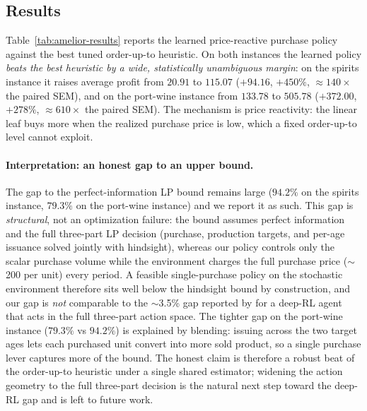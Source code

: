 \documentclass[11pt]{article}
\begin{document}
\subsection{Results}
\label{sec:amelior-results}

Table~\ref{tab:amelior-results} reports the learned price-reactive purchase policy against the best
tuned order-up-to heuristic. On both instances the learned policy \emph{beats the best heuristic by a
wide, statistically unambiguous margin}: on the spirits instance it raises average profit from
$20.91$ to $115.07$ ($+94.16$, $+450\%$, $\approx140\times$ the paired SEM), and on the port-wine instance
from $133.78$ to $505.78$ ($+372.00$, $+278\%$, $\approx610\times$ the paired SEM). The mechanism is
price reactivity: the linear leaf buys more when the realized purchase price is low, which a fixed
order-up-to level cannot exploit.

\paragraph{Interpretation: an honest gap to an upper bound.}
The gap to the perfect-information LP bound remains large ($94.2\%$ on the spirits instance,
$79.3\%$ on the port-wine instance) and we report it as such. This gap is \emph{structural}, not an
optimization failure: the bound assumes perfect information and the full three-part LP decision
(purchase, production targets, and per-age issuance solved jointly with hindsight), whereas our policy
controls only the scalar purchase volume while the environment charges the full purchase price
($\sim$200 per unit) every period. A feasible single-purchase policy on the stochastic environment
therefore sits well below the hindsight bound by construction, and our gap is \emph{not} comparable to
the $\sim$3.5\% gap reported by \citet{pahrGrunow2025} for a deep-RL agent that acts in the full
three-part action space. The tighter gap on the port-wine instance ($79.3\%$ vs $94.2\%$) is explained by
blending: issuing across the two target ages lets each purchased unit convert into more sold product,
so a single purchase lever captures more of the bound. The honest claim is therefore a robust beat of
the order-up-to heuristic under a single shared estimator; widening the action geometry to the
full three-part decision is the natural next step toward the deep-RL gap and is left to future work.
\end{document}
